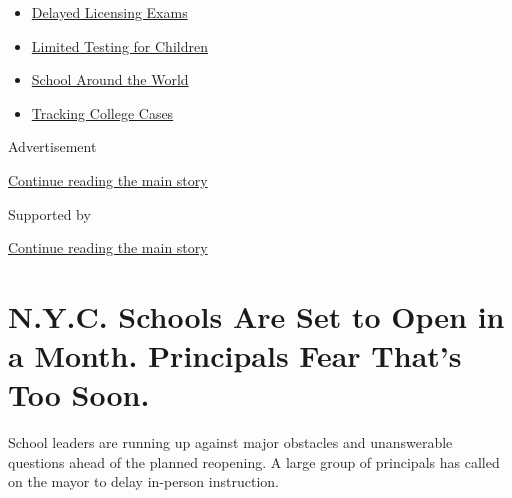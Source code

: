 \begin{itemize}
\tightlist
\item
  \href{https://www.nytimes3xbfgragh.onion/2020/09/04/us/bar-exam-coronavirus.html?name=styln-coronavirus-schools-reopening\&region=TOP_BANNER\&block=storyline_menu_recirc\&action=click\&pgtype=Article\&impression_id=ce6b7fc1-f292-11ea-8bc2-93f279d4169d\&variant=undefined}{Delayed
  Licensing Exams}
\item
  \href{https://www.nytimes3xbfgragh.onion/2020/09/08/upshot/children-testing-shortfalls-virus.html?name=styln-coronavirus-schools-reopening\&region=TOP_BANNER\&block=storyline_menu_recirc\&action=click\&pgtype=Article\&impression_id=ce6b7fc2-f292-11ea-8bc2-93f279d4169d\&variant=undefined}{Limited
  Testing for Children}
\item
  \href{https://www.nytimes3xbfgragh.onion/2020/09/01/world/schools-reopen-globe-students.html?name=styln-coronavirus-schools-reopening\&region=TOP_BANNER\&block=storyline_menu_recirc\&action=click\&pgtype=Article\&impression_id=ce6ba6d0-f292-11ea-8bc2-93f279d4169d\&variant=undefined}{School
  Around the World}
\item
  \href{https://www.nytimes3xbfgragh.onion/interactive/2020/us/covid-college-cases-tracker.html?name=styln-coronavirus-schools-reopening\&region=TOP_BANNER\&block=storyline_menu_recirc\&action=click\&pgtype=Article\&impression_id=ce6ba6d1-f292-11ea-8bc2-93f279d4169d\&variant=undefined}{Tracking
  College Cases}
\end{itemize}

Advertisement

\protect\hyperlink{after-top}{Continue reading the main story}

Supported by

\protect\hyperlink{after-sponsor}{Continue reading the main story}

\hypertarget{nyc-schools-are-set-to-open-in-a-month-principals-fear-thats-too-soon}{%
\section{N.Y.C. Schools Are Set to Open in a Month. Principals Fear
That's Too
Soon.}\label{nyc-schools-are-set-to-open-in-a-month-principals-fear-thats-too-soon}}

School leaders are running up against major obstacles and unanswerable
questions ahead of the planned reopening. A large group of principals
has called on the mayor to delay in-person instruction.

